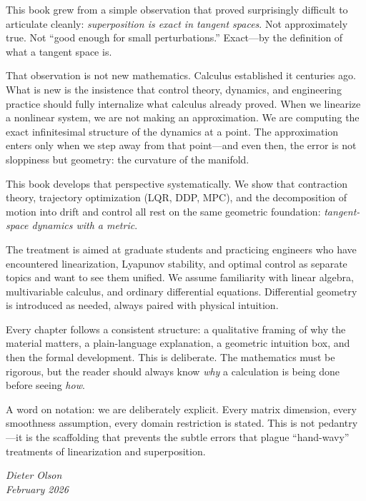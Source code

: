 \documentclass[11pt,letterpaper,openany]{book}
\theoremstyle{plain}
\theoremstyle{definition}
\theoremstyle{remark}
\begin{document}
This book grew from a simple observation that proved surprisingly difficult to articulate cleanly: \emph{superposition is exact in tangent spaces}. Not approximately true. Not ``good enough for small perturbations.'' Exact---by the definition of what a tangent space is.

That observation is not new mathematics. Calculus established it centuries ago. What is new is the insistence that control theory, dynamics, and engineering practice should fully internalize what calculus already proved. When we linearize a nonlinear system, we are not making an approximation. We are computing the exact infinitesimal structure of the dynamics at a point. The approximation enters only when we step away from that point---and even then, the error is not sloppiness but geometry: the curvature of the manifold.

This book develops that perspective systematically. We show that contraction theory, trajectory optimization (LQR, DDP, MPC), and the decomposition of motion into drift and control all rest on the same geometric foundation: \emph{tangent-space dynamics with a metric}.

The treatment is aimed at graduate students and practicing engineers who have encountered linearization, Lyapunov stability, and optimal control as separate topics and want to see them unified. We assume familiarity with linear algebra, multivariable calculus, and ordinary differential equations. Differential geometry is introduced as needed, always paired with physical intuition.

Every chapter follows a consistent structure: a qualitative framing of why the material matters, a plain-language explanation, a geometric intuition box, and then the formal development. This is deliberate. The mathematics must be rigorous, but the reader should always know \emph{why} a calculation is being done before seeing \emph{how}.

A word on notation: we are deliberately explicit. Every matrix dimension, every smoothness assumption, every domain restriction is stated. This is not pedantry---it is the scaffolding that prevents the subtle errors that plague ``hand-wavy'' treatments of linearization and superposition.

\vspace{1cm}
\hfill\textit{Dieter Olson}\\
\hfill\textit{February 2026}

\tableofcontents

\mainmatter
\end{document}
